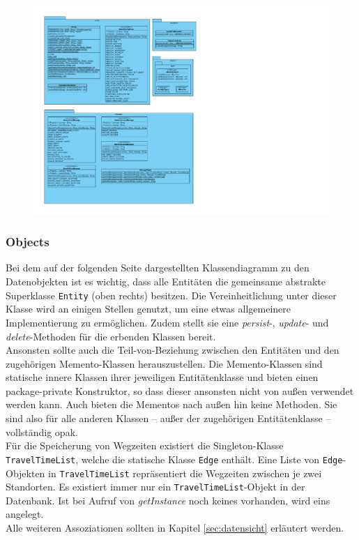\documentclass[fontsize=12pt,paper=a4,twoside]{scrartcl}
\begin{document}
\begin{figure}[H]
\includegraphics[width=\textwidth]{common.pdf}
\end{figure}
\newpage

\subsubsection{Objects}
\label{subsubsec:Objects}
Bei dem auf der folgenden Seite dargestellten Klassendiagramm zu den Datenobjekten ist es wichtig, dass alle Entitäten die gemeinsame abstrakte Superklasse \texttt{Entity} (oben rechts) besitzen. Die Vereinheitlichung unter dieser Klasse wird an einigen Stellen genutzt, um eine etwas allgemeinere Implementierung zu ermöglichen. Zudem stellt sie eine \textit{persist}-, \textit{update}- und \textit{delete}-Methoden für die erbenden Klassen bereit.\\
Ansonsten sollte auch die Teil-von-Beziehung zwischen den Entitäten und den zugehörigen Memento-Klassen herauszustellen. Die Memento-Klassen sind statische innere Klassen ihrer jeweiligen Entitätenklasse und bieten einen package-private Konstruktor, so dass dieser ansonsten nicht von außen verwendet werden kann. Auch bieten die Mementos nach außen hin keine Methoden. Sie sind also für alle anderen Klassen -- außer der zugehörigen Entitätenklasse -- vollständig opak.\\
Für die Speicherung von Wegzeiten existiert die Singleton-Klasse \texttt{TravelTimeList}, welche die statische Klasse \texttt{Edge} enthält. Eine Liste von \texttt{Edge}-Objekten in \texttt{TravelTimeList} repräsentiert die Wegzeiten zwischen je zwei Standorten. Es existiert immer nur ein \texttt{TravelTimeList}-Objekt in der Datenbank. Ist bei Aufruf von \textit{getInstance} noch keines vorhanden, wird eins angelegt.\\
Alle weiteren Assoziationen sollten in Kapitel \ref{sec:datensicht} erläutert werden.
\end{document}
